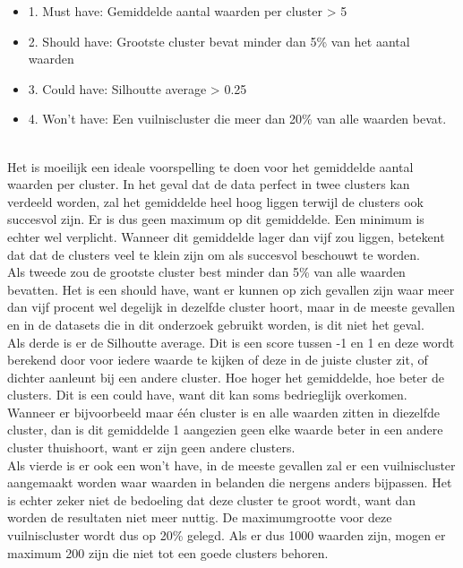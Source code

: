 \begin{itemize}
    \item1. Must have: Gemiddelde aantal waarden per cluster > 5
    \item2. Should have: Grootste cluster bevat minder dan 5\% van het aantal waarden
    \item3. Could have: Silhoutte average > 0.25
    \item4. Won't have: Een vuilniscluster die meer dan 20\% van alle waarden bevat.
\end{itemize}
\\\indent
Het is moeilijk een ideale voorspelling te doen voor het gemiddelde aantal waarden per cluster. In het geval dat de data perfect in twee clusters kan verdeeld worden, zal het gemiddelde heel hoog liggen terwijl de clusters ook succesvol zijn. Er is dus geen maximum op dit gemiddelde. Een minimum is echter wel verplicht. Wanneer dit gemiddelde lager dan vijf zou liggen, betekent dat dat de clusters veel te klein zijn om als succesvol beschouwt te worden.
\\\indent
Als tweede zou de grootste cluster best minder dan 5\% van alle waarden bevatten. Het is een should have, want er kunnen op zich gevallen zijn waar meer dan vijf procent wel degelijk in dezelfde cluster hoort, maar in de meeste gevallen en in de datasets die in dit onderzoek gebruikt worden, is dit niet het geval.
\\\indent
Als derde is er de Silhoutte average. Dit is een score tussen -1 en 1 en deze wordt berekend door voor iedere waarde te kijken of deze in de juiste cluster zit, of dichter aanleunt bij een andere cluster. Hoe hoger het gemiddelde, hoe beter de clusters. Dit is een could have, want dit kan soms bedrieglijk overkomen. Wanneer er bijvoorbeeld maar één cluster is en alle waarden zitten in diezelfde cluster, dan is dit gemiddelde 1 aangezien geen elke waarde beter in een andere cluster thuishoort, want er zijn geen andere clusters.
\\\indent
Als vierde is er ook een won't have, in de meeste gevallen zal er een vuilniscluster aangemaakt worden waar waarden in belanden die nergens anders bijpassen. Het is echter zeker niet de bedoeling dat deze cluster te groot wordt, want dan worden de resultaten niet meer nuttig. De maximumgrootte voor deze vuilniscluster wordt dus op 20\% gelegd. Als er dus 1000 waarden zijn, mogen er maximum 200 zijn die niet tot een goede clusters behoren.
\\\indent



